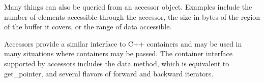 Many things can also be queried from an accessor object. Examples include the number of elements accessible through the accessor, the size in bytes of the region of the buffer it covers, or the range of data accessible.\par

Accessors provide a similar interface to C++ containers and may be used in many situations where containers may be passed. The container interface supported by accessors includes the data method, which is equivalent to get\_pointer, and several flavors of forward and backward iterators.\par










































